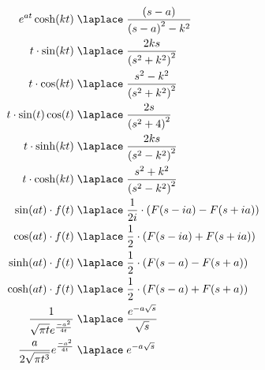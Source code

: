\begin{align*}
    e^{at}\cosh(kt)                 \;                      & \laplace\; \frac{{(s-a)}}{{(s-a)}^2-k^2}                                      \\
    t\cdot \sin(kt)                 \;                      & \laplace\; \frac{2ks}{{(s^2+k^2)}^2}                                          \\
    t\cdot \cos(kt)                 \;                      & \laplace\; \frac{s^2-k^2}{{(s^2+k^2)}^2}                                      \\
    t\cdot \sin(t)\cos(t)           \;                      & \laplace\; \frac{2s}{{(s^2+4)}^2}                                             \\
    t\cdot \sinh(kt)                \;                      & \laplace\; \frac{2ks}{{(s^2-k^2)}^2}                                          \\
    t\cdot \cosh(kt)                \;                      & \laplace\; \frac{s^2+k^2}{{(s^2-k^2)}^2}                                      \\
    \sin(at)\cdot f(t)              \;                      & \laplace\; \frac{1}{2i}\cdot(F(s-ia)-F(s+ia))                                 \\
    \cos(at)\cdot f(t)              \;                      & \laplace\; \frac{1}{2}\cdot(F(s-ia)+F(s+ia))                                  \\
    \sinh(at)\cdot f(t)             \;                      & \laplace\; \frac{1}{2}\cdot(F(s-a)-F(s+a))                                    \\
    \cosh(at)\cdot f(t)             \;                      & \laplace\; \frac{1}{2}\cdot(F(s-a)+F(s+a))                                    \\
    \frac{1}{\sqrt{\pi t}e^{\frac{-a^2}{4t}}} \;            & \laplace\; \frac{e^{-a\sqrt{s}}}{\sqrt{s}}                                    \\
    \frac{a}{2\sqrt{\pi t^3}}e^{\frac{-a^2}{4t}} \;         & \laplace\; e^{-a\sqrt{s}}
\end{align*}